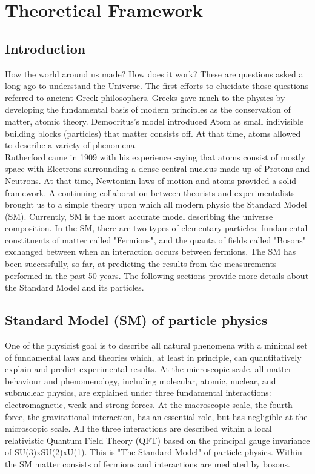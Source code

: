 \newpage
\chapter{Theoretical Framework}
\label{chap1}
\section{Introduction}
\label{chap1:intro}
How the world around us made? How does it work? These are questions asked a long-ago to understand the Universe. The first efforts to elucidate those questions referred to ancient Greek philosophers. Greeks gave much to the physics by developing the fundamental basis of modern principles as the conservation of matter, atomic theory. Democritus's model introduced Atom as small indivisible building blocks (particles) that matter consists off. At that time, atoms allowed to describe a variety of phenomena. \\
Rutherford came in 1909 with his experience saying that atoms consist of mostly space with Electrons surrounding a dense central nucleus made up of Protons and Neutrons. At that time, Newtonian laws of motion and atoms provided a solid framework. A continuing collaboration between theorists and experimentalists brought us to a simple theory upon which all modern physic the Standard Model (SM). Currently, SM is the most accurate model describing the universe composition. In the SM, there are two types of elementary particles: fundamental constituents of matter called "Fermions", and the quanta of fields called "Bosons" exchanged between when an interaction occurs between fermions. The SM has been successfully, so far, at predicting the results from the measurements performed in the past 50 years. The following sections provide more details about the Standard Model and its particles.
\section{Standard Model (SM) of particle physics}
\label{chap1:SM}
One of the physicist goal is to describe all natural phenomena with a minimal set of fundamental laws and theories which, at least in principle, can quantitatively explain and predict experimental results. At the microscopic scale, all matter behaviour and phenomenology, including molecular, atomic, nuclear, and subnuclear physics, are explained under three fundamental interactions: electromagnetic, weak and strong forces. At the macroscopic scale, the fourth force, the gravitational interaction, has an essential role, but has negligible at the microscopic scale. All the three interactions are described within a local relativistic Quantum Field Theory (QFT) based on the principal gauge invariance of SU(3)xSU(2)xU(1). This is "The Standard Model" of particle physics. Within the SM matter consists of fermions and interactions are mediated by bosons. 

